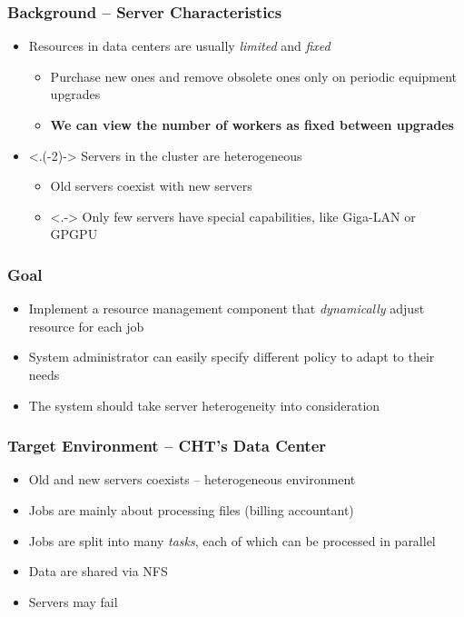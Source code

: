 \documentclass{beamer}
\begin{document}
\begin{frame}
  \frametitle{Background -- Server Characteristics}
  \begin{itemize}[<+->]
    \item Resources in data centers are usually \emph{limited} and
      \emph{fixed}
      \begin{itemize}
        \item Purchase new ones and remove obsolete ones only on
          periodic equipment upgrades
        \item \textbf{We can view the number of workers as fixed between
          upgrades}
      \end{itemize}
    \item <.(-2)-> Servers in the cluster are \alert{heterogeneous}
      \begin{itemize}
        \item Old servers coexist with new servers
        \item <.-> Only few servers have special capabilities, like Giga-LAN
          or GPGPU
      \end{itemize}
  \end{itemize}
\end{frame}
\begin{frame}
  \frametitle{Goal}
  \begin{itemize}
    \item Implement a resource management component that \emph{dynamically}
      adjust resource for each job
    \item System administrator can easily specify different policy to
      adapt to their needs
    \item The system should take server heterogeneity into consideration
  \end{itemize}
\end{frame}
\begin{frame}
  \frametitle{Target Environment -- CHT's Data Center}
  \begin{itemize}
    \item Old and new servers coexists -- heterogeneous environment
    \item Jobs are mainly about processing files (billing accountant)
    \item Jobs are split into many \emph{tasks}, each of which can be processed
      in parallel
    \item Data are shared via NFS
    \item Servers may fail
  \end{itemize}
\end{frame}
\end{document}

